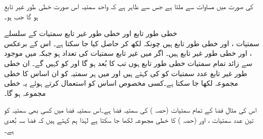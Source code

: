  کی صورت میں مساوات  سے  ملتا ہے جس سے ظاہر ہے کہ واحد سمتیہ  اس صورت خطی طور غیر تابع ہو گا جب  ہو۔

\quad خطی طور تابع اور خطی طور غیر تابع سمتیات کے سلسلے\\
سمتیات ،  اور  خطی طور تابع ہیں چونکہ
  لکھ کر  حاصل کیا جا سکتا ہے۔ اس کے برعکس ،  اور  خطی طور غیر تابع ہیں۔
اگر  میں غیر تابع سمتیات کی تعداد  ہو  جبکہ  میں موجود   سے زائد  تمام سمتیات خطی طور تابع ہوں تب  کا بُعد  ہو گا اور  کو   کہیں گے۔ ان خطی طور غیر تابع  عدد سمتیات کو  کی  کہتے ہیں اور  میں ہر سمتیہ کو ان اساس کا خطی مجموعہ لکھا جا سکتا ہے۔کسی مخصوص اساس کو استعمال کرتے ہوئے یہ خطی مجموعہ  ہو گا۔

اس کی مثال فضا کے تمام سمتیات (حصہ ) کی سمتیہ فضا ہے۔اس سمتیہ فضا میں کسی بھی سمتیہ کو تین عدد سمتیات  ،  اور   (حصہ ) کا خطی مجموعہ لکھا جا سکتا ہے لہٰذا ہم کہتے ہیں کہ فضا سہ بُعدی  ہے۔

